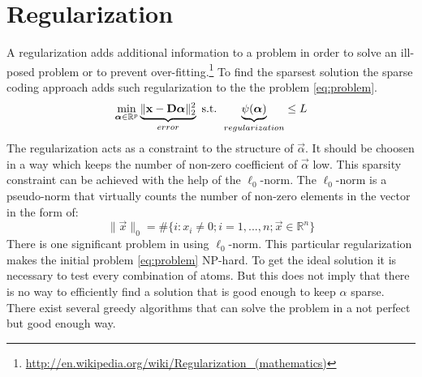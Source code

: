 \section{Regularization}
A regularization adds additional information to a problem in order to solve an
ill-posed problem or to prevent over-fitting.\footnote{\url{
http://en.wikipedia.org/wiki/Regularization_(mathematics)}}
To find the sparsest solution the sparse coding approach adds such
regularization to the the problem \ref{eq:problem}. 
\begin{equation}
\min_{\boldsymbol{\mathrm{\alpha}}\in\mathbb{R}^{p}}
\underbrace{\lVert \boldsymbol{\mathrm{x}} -
\boldsymbol{\mathrm{D}}\boldsymbol{\mathrm{\alpha}}\rVert^{2}_{2}}_{error} \text{ s.t. }
\underbrace{\psi(\boldsymbol{\mathrm{\alpha}})}_{regularization}\leq L \label{eq:problem}
\end{equation}
The regularization acts as a constraint to the structure of $\vec{\alpha}$. It
should be choosen in a way which keeps the number of non-zero coefficient of
$\vec{\alpha}$ low. 
This sparsity constraint can be achieved with the help of
the $\ell_0$-norm. The $\ell_0$-norm is a pseudo-norm that virtually counts the
number of non-zero elements in the vector in the form of:
\begin{equation}
\lVert \vec{x} \rVert_{0} = \#\{i:x_i \neq 
0; i=1,...,n; \vec{x}\in\mathbb{R}^n\} 
\end{equation}
There is one significant problem in using $\ell_0$-norm. This particular
regularization makes the initial problem \ref{eq:problem} NP-hard. To get the
ideal solution it is necessary to test every combination of atoms. But this
does not imply that there is no way to efficiently find a solution that is good
enough to keep $\alpha$ sparse. There exist several greedy algorithms that can
solve the problem in a not perfect but good enough way. 

